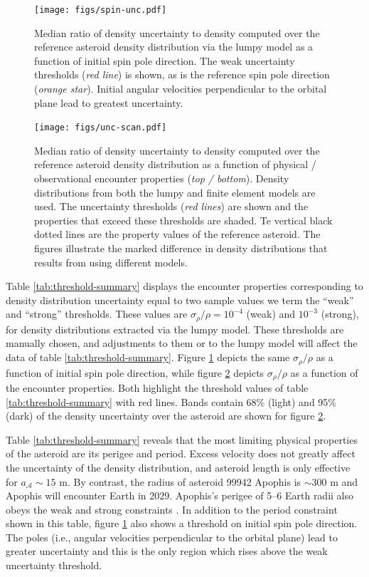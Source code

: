 \documentclass[fleqn,usenatbib]{mnras}
\begin{document}
\begin{figure}
  \centering
  \texttt{[image: figs/spin-unc.pdf]}
  \caption{Median ratio of density uncertainty to density computed over the reference asteroid density distribution via the lumpy model as a function of initial spin pole direction. The weak uncertainty thresholds (\textit{red line}) is shown, as is the reference spin pole direction (\textit{orange star}). Initial angular velocities perpendicular to the orbital plane lead to greatest uncertainty.}
  \label{fig:spin-uncertainty}
\end{figure}

\begin{figure}
  \centering
  \texttt{[image: figs/unc-scan.pdf]}
  \caption{Median ratio of density uncertainty to density computed over the reference asteroid density distribution as a function of physical / observational encounter properties (\textit{top / bottom}). Density distributions from both the lumpy and finite element models are used. The uncertainty thresholds (\textit{red lines}) are shown and the properties that exceed these thresholds are shaded. Te vertical black dotted lines are the property values of the reference asteroid. The figures illustrate the marked difference in density distributions that results from using different models.}
  \label{fig:net-uncertainty}
\end{figure}

Table \ref{tab:threshold-summary} displays the encounter properties corresponding to density distribution uncertainty equal to two sample values we term the ``weak'' and ``strong'' thresholds. These values are $\sigma_\rho / \rho = 10^{-4}$ (weak) and $10^{-3}$ (strong), for density distributions extracted via the lumpy model. These thresholds are manually chosen, and adjustments to them or to the lumpy model will affect the data of table \ref{tab:threshold-summary}. Figure \ref{fig:spin-uncertainty} depicts the same $\sigma_\rho / \rho$ as a function of initial spin pole direction, while figure \ref{fig:net-uncertainty} depicts $\sigma_\rho / \rho$ as a function of the encounter properties. Both highlight the threshold values of table \ref{tab:threshold-summary} with red lines. Bands contain 68\% (light) and 95\% (dark) of the density uncertainty over the asteroid are shown for figure \ref{fig:net-uncertainty}.

Table \ref{tab:threshold-summary} reveals that the most limiting physical properties of the asteroid are its perigee and period. Excess velocity does not greatly affect the uncertainty of the density distribution, and asteroid length is only effective for $a_\mathcal{A} \sim 15$ m. By contrast, the radius of asteroid 99942 Apophis is 
$\sim 300$ m and Apophis will encounter Earth in 2029. Apophis's perigee of 5--6 Earth radii also obeys the weak and strong constraints \cite{giorgini2008predicting}. In addition to the period constraint shown in this table, figure \ref{fig:spin-uncertainty} also shows a threshold on initial spin pole direction. The poles (i.e., angular velocities perpendicular to the orbital plane) lead to greater uncertainty and this is the only region which rises above the weak uncertainty threshold.
\end{document}
